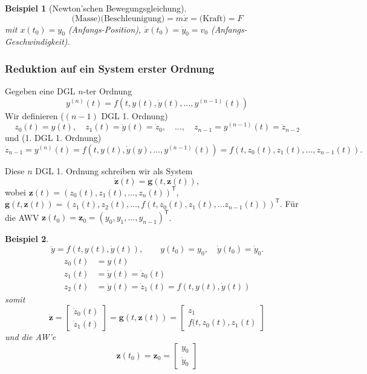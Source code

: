 \documentclass[a4paper]{article}
\newtheorem{bsp}{Beispiel}
\renewcommand{\vec}[1]{\mathbf{\bm{#1}}}
\begin{document}
\begin{bsp}[Newton'schen Bewegungsgleichung]
  \[
    \text{(Masse)} \text{(Beschleunigung)} = m \dot{x}
    = \text{(Kraft)} = F
  \]
  mit $x(t_0) = y_0$ (Anfangs-Position), $\dot{x}(t_0) = \dot{y}_0 = v_0$
  (Anfangs-Geschwindigkeit).
\end{bsp}

\subsubsection*{Reduktion auf ein System erster Ordnung}

Gegeben eine DGL $n$-ter Ordnung
\[
  y^{(n)}(t) = f(t, y(t), \dot{y}(t), \ldots, y^{(n-1)}(t))
\]
Wir definieren ($(n-1)$ DGL 1. Ordnung)
\[
  z_0(t) = y(t), \quad
  z_1(t) = \dot{y}(t) = \dot{z}_0, \quad
  \ldots, \quad
  z_{n-1} = y^{(n-1)}(t) = \dot{z}_{n-2}
\]
und (1. DGL 1. Ordnung)
\[
  \dot{z}_{n-1} = y^{(n)}(t) = f(t, y(t), \dot{y}(y), \ldots, y^{(n-1)}(t))
  = f(t, z_0(t), z_1(t), \ldots, z_{n-1}(t)).
\]

Diese $n$ DGL 1. Ordnung schreiben wir als System
\[
  \dot{\vec{z}}(t) = \vec{g}(t, \vec{z}(t)),
\]
wobei $\vec{z}(t) = (z_0(t), z_1(t), \ldots, z_n(t))^\mathsf{T}$, $\vec{g}(t,
\vec{z}(t)) = (z_1(t), z_2(t), \ldots, f(t, z_0(t), z_1(t), \ldots
z_{n-1}(t)))^\mathsf{T}$. Für die AWV $\vec{z}(t_0) = \vec{z}_0 = (y_0, y_1,
\ldots, y_{n-1})^\mathsf{T}$.

\begin{bsp}
  \[
    \ddot{y} = f(t, y(t), \dot{y}(t)), \qquad
    y(t_0) = y_0, \quad \dot{y}(t_0) = \dot{y}_0.
  \]
  \begin{align*}
    z_0(t) &= y(t) \\
    z_1(t) &= \dot{y}(t) = \dot{z}_0(t) \\
    z_2(t) &= \ddot{y}(t) = \dot{z}_1(t) = f(t, y(t), \dot{y}(t))
  \end{align*}
  somit
  \[
    \dot{\vec{z}} = \begin{bmatrix}
      \dot{z}_0(t) \\ \dot{z}_1(t)
    \end{bmatrix}
    = \vec{g}(t, \vec{z}(t))
    = \begin{bmatrix}
      z_1 \\ f(t, z_0(t), z_1(t)
    \end{bmatrix}
  \]
  und die AW'e
  \[
    \vec{z}(t_0) = \vec{z}_0 = \begin{bmatrix}
      y_0 \\ \dot{y}_0
    \end{bmatrix}
  \]
\end{bsp}
\end{document}
